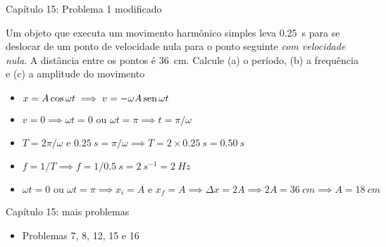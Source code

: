 \begin{frame}{Capítulo 15: Problema 1 modificado}
    \begin{minipage}{\textwidth}
        Um objeto que executa um movimento harmônico simples leva \SI{0.25}{s} para se deslocar de um ponto de
        velocidade nula para o ponto seguinte \textit{com velocidade nula}. A distância entre os pontos é \SI{36}{cm}. Calcule (a) o
        período, (b) a frequência e (c) a amplitude do movimento
    \end{minipage}
    \pause
    \begin{itemize}
    \color{blue}
        \item \(x=A\cos{\omega t} \implies v=-\omega A \operatorname{sen}{\omega t} \)
        \item \(v=0 \implies \omega t = 0 \text{ ou } \omega t = \pi \implies t = \pi /\omega\)
        \item \(T=2\pi / \omega \text{ e } \SI{0.25}{s} = \pi / \omega \implies T=2 \times \SI{0.25}{s} = \SI{0.50}{s}\)
        \item \(f=1/T \implies f=1/\SI{0.5}{s} = \SI{2}{s^{-1}} = \SI{2}{Hz}\)
        \item \(\omega t = 0 \text{ ou } \omega t = \pi \implies x_i=A \text{ e } x_f=A \implies \Delta x = 2A 
            \implies 2A= \SI{36}{cm} \implies {A=\SI{18}{cm}}\)
    \end{itemize}
\end{frame}

\begin{frame}{Capítulo 15: mais problemas}
    \begin{itemize}
        \item Problemas 7, 8, 12, 15 e 16
    \end{itemize}
\end{frame}

